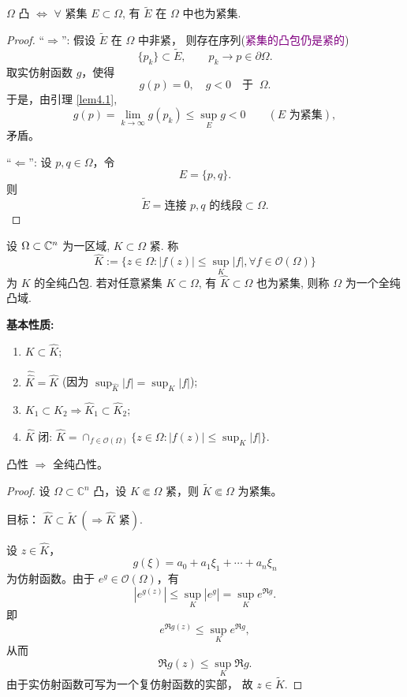 \begin{proposition}
    $\Omega $ 凸 $\iff $ $\forall $  紧集 $E \subset \Omega $, 有 $\widetilde{E}$ 在 $\Omega $ 中也为紧集.     
\end{proposition}
\begin{proof}
    ``\(\Rightarrow\)'': 假设 \(\widetilde{E}\) 在 \(\Omega\) 中非紧，
则存在序列(\textcolor{purple}{紧集的凸包仍是紧的})
\[
\{p_k\}\subset \widetilde{E},
\qquad
p_k\longrightarrow p\in\partial\Omega.
\]
取实仿射函数 \(g\)，使得
\[
g(p)=0,
\quad
g<0 \quad \text{于 }~\Omega.
\]
于是，由引理 \ref{lem4.1},
\[
g(p)
=
\lim_{k\to\infty}g(p_k)
\leq
\sup_E g
<0
\qquad
(E\text{ 为紧集}),
\]
矛盾。

``\(\Leftarrow\)'':  设 \(p,q\in\Omega\)，令
\[
E=\{p,q\}.
\]
则
\[
\widetilde{E}
=
\text{连接 \(p,q\) 的线段}
\subset\Omega.
\]
\end{proof}

\begin{definition}
    设 $\Omega \subset {\mathbb C}^n$ 为一区域, $K \subset \Omega $ 紧. 称 
    $$ \hat{K}:=\big\{z \in \Omega : \left| f(z) \right| \leq \sup_{K}|f|, \forall f \in \mathcal{O}(\Omega )\big\} $$
    为 $K$ 的全纯凸包. 
    若对任意紧集 $K \subset \Omega $, 有 $\hat{K} \subset \Omega $ 也为紧集, 则称 $\Omega $ 为一个全纯凸域.      
\end{definition}

\noindent\textbf{基本性质:} 
\begin{enumerate}[(1)]
    \item $K \subset \hat{K}$;
    \item $\hat{\hat{K}}=\hat{K}$ (因为 $\sup_{\hat{K}} \left| f \right| =\sup_K \left| f \right| $); 
    \item $K_1 \subset K_2 \Rightarrow \hat{K}_1 \subset \hat{K}_2$;
    \item $\hat{K}$ 闭: $\hat{K}=\cap _{f \in \mathcal{O}(\Omega )} \{z \in \Omega : \left| f(z) \right| \leq \sup_K \left| f \right| \}$.     
\end{enumerate}

\begin{example}
凸性 \(\Longrightarrow\) 全纯凸性。
\end{example}

\begin{proof}
设 \(\Omega\subset\mathbb{C}^n\) 凸，设 \(K\Subset\Omega\) 紧，则
\(
\widetilde{K}\Subset\Omega
\)
为紧集。

目标：
\(
\widehat{K}\subset\widetilde{K}
~
(\Longrightarrow \widehat{K}\text{ 紧}).
\)

设 \(z\in\widehat{K}\)，
\[
g(\xi)=a_0+a_1\xi_1+\cdots+a_n\xi_n
\]
为仿射函数。由于 \(e^g\in\mathcal{O}(\Omega)\)，有
\[
\left|e^{g(z)}\right|
\leq
\sup_K\left|e^g\right|
=
\sup_K e^{\Re g}.
\]
即
\[
e^{\Re g(z)}
\leq
\sup_K e^{\Re g},
\]
从而
\[
\Re g(z)
\leq
\sup_K\Re g.
\]
由于实仿射函数可写为一个复仿射函数的实部，
故
\(
z\in\widetilde{K}.
\)
\end{proof}

